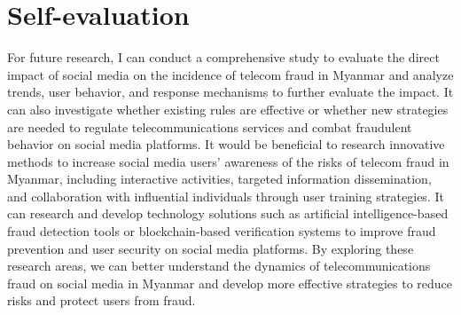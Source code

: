 \documentclass[man,floatsintext]{apa7}
\begin{document}
\section{Self-evaluation}

For future research, I can conduct a comprehensive study to evaluate the direct impact of social media on the incidence of telecom fraud in Myanmar and analyze trends, user behavior, and response mechanisms to further evaluate the impact. It can also investigate whether existing rules are effective or whether new strategies are needed to regulate telecommunications services and combat fraudulent behavior on social media platforms. It would be beneficial to research innovative methods to increase social media users' awareness of the risks of telecom fraud in Myanmar, including interactive activities, targeted information dissemination, and collaboration with influential individuals through user training strategies. It can research and develop technology solutions such as artificial intelligence-based fraud detection tools or blockchain-based verification systems to improve fraud prevention and user security on social media platforms. By exploring these research areas, we can better understand the dynamics of telecommunications fraud on social media in Myanmar and develop more effective strategies to reduce risks and protect users from fraud.

\printbibliography{}
\end{document}
